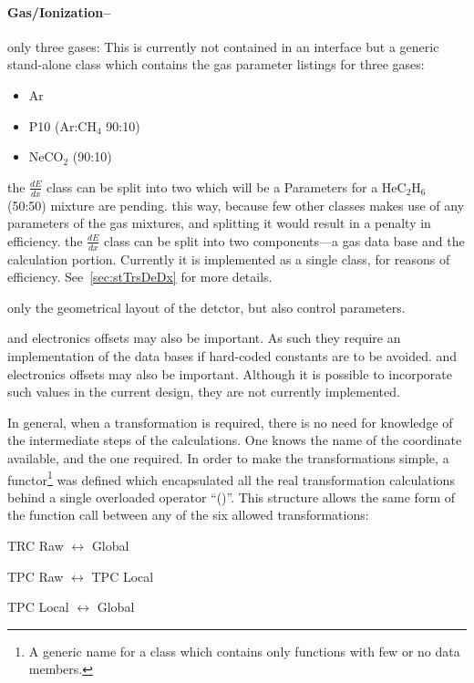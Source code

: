 \documentclass[twoside]{article}
\begin{document}
\paragraph{Gas/Ionization--}
only three gases:
This is currently not contained in an interface but a generic
stand-alone class which contains the gas parameter listings for
three gases:
\begin{itemize}
  \item Ar
  \item P10 (Ar:CH$_{4}$ 90:10)
  \item NeCO$_{2}$ (90:10)
\end{itemize}
the $\frac{dE}{dx}$ class can be split into two which will be a 
Parameters for a HeC$_{2}$H$_{6}$ (50:50) mixture are pending.
this way, because few other classes makes use of any parameters of the gas
mixtures, and splitting it would result in a penalty in efficiency.
the $\frac{dE}{dx}$ class can be split into two components---a 
gas data base and the calculation portion.  Currently it is implemented
as a single class, for reasons of efficiency.
See~\ref{sec:stTrsDeDx} for more details.

only the geometrical layout of the detctor, but also control parameters.

and electronics offsets may also be important.
As such they require an implementation of the data bases if hard-coded
constants are to be avoided.
and electronics offsets may also be important.  Although it is possible
to incorporate such values in the current design, they are not currently
implemented.

In general, when a transformation is required, there is no need 
for knowledge of the intermediate steps of the calculations.  One
knows the name of the coordinate available, and the one required.
In order to make the transformations simple, a 
functor\footnote{A generic name for a class which contains
  only functions with few or no data members.} 
was defined 
which encapsulated all the real transformation calculations behind
a single overloaded operator ``()''.  This structure allows the
same form of the function call between any of the six
allowed transformations:
  \item TRC Raw $\leftrightarrow$ Global
  \item TPC Raw $\leftrightarrow$ TPC Local
  \item TPC Local $\leftrightarrow$ Global
\end{document}
